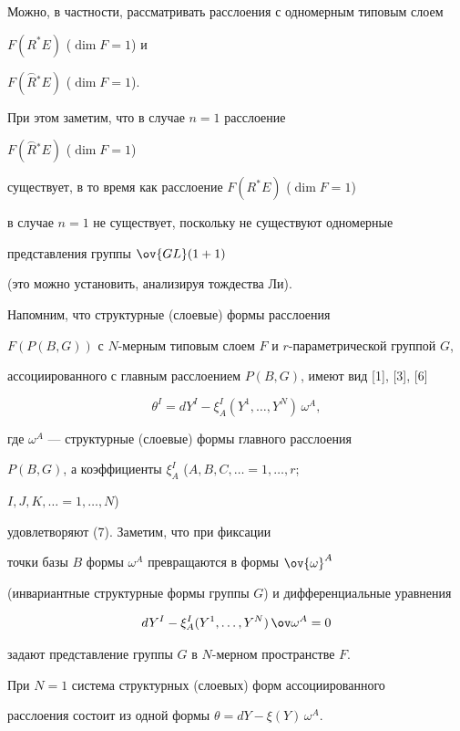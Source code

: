 Можно, в частности, рассматривать расслоения с одномерным типовым слоем


$F ({R^ * E})$ (${\dim F=1}$) и


$F (\overset{\frown}{R}{}^ * E)$ (${\dim F=1}$).


При этом заметим, что в случае $n=1$ расслоение


$F (\overset{\frown}{R}{}^ * E)$ (${\dim F=1}$)


существует, в то время как расслоение $F ({R^ * E})$ (${\dim F=1}$)


в случае $n=1$ не существует, поскольку не существуют одномерные 


представления группы $\ov {GL} ({1+1})$


(это можно установить, анализируя тождества Ли).





Напомним, что структурные (слоевые) формы расслоения 


$F(P(B,G))$ с $N$-мерным типовым слоем $F$ и $r$-параметрической группой $G$,


ассоциированного с главным расслоением $P(B,G)$, имеют вид [1], [3], [6]


$$


\theta^I=dY^I-\xi_A^I ({Y^1, \dotsc,Y^N})\,\omega^A,


$$


где $\omega^A$ --- структурные (слоевые) формы главного расслоения


$P(B,G)$, а коэффициенты $\xi_A^I$ ($A,B,C, \dotsc=1, \dotsc,r$;


$I,J,K, \dotsc=1, \dotsc,N$)


удовлетворяют (7). Заметим, что при фиксации 


точки базы $B$ формы $\omega^A$ превращаются в формы $\ov{\omega}^A$


(инвариантные структурные формы группы $G$) и дифференциальные уравнения


$$


dY^I-\xi_A^I ({Y^1, \dotsc,Y^N})\,\ov \omega^A=0


$$


задают представление группы $G$ в $N$-мерном пространстве $F$.


При $N=1$ система структурных (слоевых) форм ассоциированного 


расслоения состоит из одной формы $\theta=dY-\xi (Y)\,\omega^A$.





